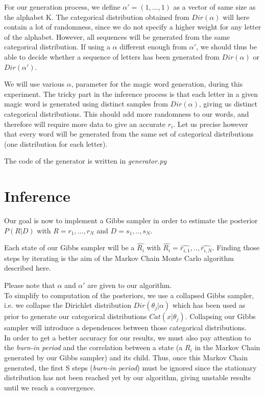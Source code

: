 For our generation process, we define $\alpha' = (1,...,1)$ as a vector of same size as the alphabet K. The categorical distribution obtained from $Dir(\alpha)$ will here contain a lot of randomness, since we do not specify a higher weight for any letter of the alphabet. However, all sequences will be generated from the same categorical distribution. If using a $\alpha$ different enough from $\alpha'$, we should thus be able to decide whether a sequence of letters has been generated from $Dir(\alpha)$ or $Dir(\alpha')$.

We will use various $\alpha$, parameter for the magic word generation, during this experiment. The tricky part in the inference process is that each letter in a given magic word is generated using distinct samples from $Dir(\alpha)$, giving us distinct categorical distributions. This should add more randomness to our words, and therefore will require more data to give an accurate $r_i$. Let us precise however that every word will be generated from the same set of categorical distributions (one distribution for each letter).

The code of the generator is written in \textit{generator.py}


\section{Inference}
Our goal is now to implement a Gibbs sampler in order to estimate the posterior $P(R|D)$ with $R = {r_1,...,r_N}$ and $D = {s_1,..,s_N}$.

Each state of our Gibbs sampler will be a $\widehat{R_i}$ with $\widehat{R_i} = {\widehat{r_{i,1}},..,\widehat{r_{i,N}}}$. Finding those steps by iterating is the aim of the Markov Chain Monte Carlo algorithm described here.

Please note that $\alpha$ and $\alpha'$ are given to our algorithm.
\\

To simplify to computation of the posteriors, we use a collapsed Gibbs sampler, i.e. we collapse the Dirichlet distribution $Dir(\theta_j|\alpha)$ which has been used as prior to generate our categorical distributions $Cat(x|\theta_j)$.
Collapsing our Gibbs sampler will introduce a dependences between those categorical distributions.
\\

In order to get a better accuracy for our results, we must also pay attention to the \textit{burn-in period} and the correlation between a state (a $R_i$ in the Markov Chain generated by our Gibbs sampler) and its child. Thus, once this Markov Chain generated, the first S steps (\textit{burn-in period}) must be ignored since the stationary distribution has not been reached yet by our algorithm, giving unstable results until we reach a convergence.

